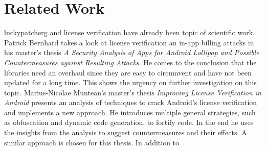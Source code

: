 \section{Related Work} \label{subsection:introduction-related}
\gls{luckypatcherg} and license verification have already been topic of scientific work.
\newline
Patrick Bernhard takes a look at license verification an in-app billing attacks in his master's thesis \textit{A Security Analysis of Apps for Android Lollipop and Possible Countermeasures against Resulting Attacks}.
He comes to the conclusion that the libraries need an overhaul since they are easy to circumvent and have not been updated for a long time.
This shows the urgency on further investigation on this topic.
\newline
Marius-Nicolae Muntean's master's thesis \textit{Improving License Verification in Android} presents an analysis of techniques to crack Android's license verification and implements a new approach.
He introduces multiple general strategies, such as obfuscation and dynamic code generation, to fortify code.
In the end he uses the insights from the analysis to suggest countermeasures and their effects.
A similar approach is chosen for this thesis.
\newline
In addition to 
